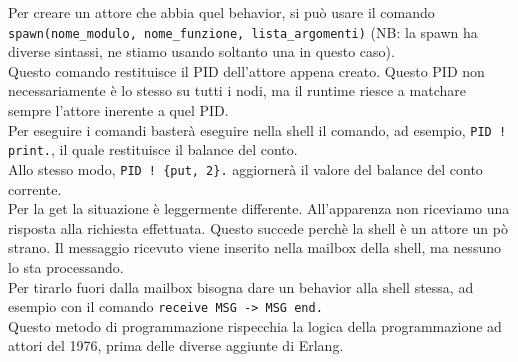 \documentclass{article}
\begin{document}
Per creare un attore che abbia quel behavior, si può usare il comando \texttt{spawn(nome\_modulo, nome\_funzione, lista\_argomenti)} (NB: la spawn ha diverse sintassi, ne stiamo usando soltanto una in questo caso).\\
Questo comando restituisce il PID dell'attore appena creato. Questo PID non necessariamente è lo stesso su tutti i nodi, ma il runtime riesce a matchare sempre l'attore inerente a quel PID.\vspace{14pt}\\
Per eseguire i comandi basterà eseguire nella shell il comando, ad esempio, \texttt{PID ! print.}, il quale restituisce il balance del conto.\\
Allo stesso modo, \texttt{PID ! \{put, 2\}.} aggiornerà il valore del balance del conto corrente.\vspace{14pt}\\
Per la get la situazione è leggermente differente. All'apparenza non riceviamo una risposta alla richiesta effettuata. Questo succede perchè la shell è un attore un pò strano. Il messaggio ricevuto viene inserito nella mailbox della shell, ma nessuno lo sta processando.\\
Per tirarlo fuori dalla mailbox bisogna dare un behavior alla shell stessa, ad esempio con il comando \texttt{receive MSG -> MSG end.}\vspace{14pt}\\
Questo metodo di programmazione rispecchia la logica della programmazione ad attori del 1976, prima delle diverse aggiunte di Erlang.
\end{document}
